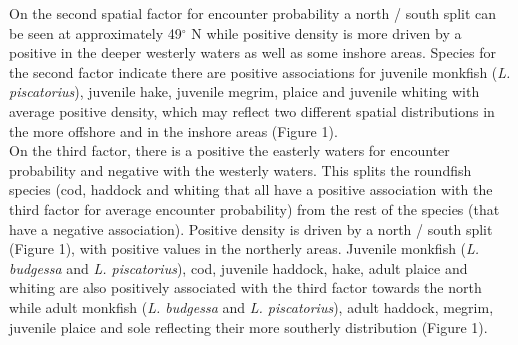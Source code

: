 \documentclass[fleqn,10pt]{wlscirep}
\begin{document}
\begin{linenumbers}
On the second spatial factor for  encounter probability a
north / south split can be seen at approximately 49$^{\circ}$ N while positive
density is more driven by a positive  in
the deeper westerly waters as well as some inshore areas. Species
 for the second factor indicate there are
positive associations for juvenile monkfish (\emph{L.  piscatorius}), juvenile
hake, juvenile megrim, plaice and juvenile whiting with average positive
density, which may reflect two different spatial distributions in the more
offshore and in the inshore areas (Figure 1).\\

On the third factor, there is a positive  the easterly waters for encounter probability
and negative  with the westerly waters. This splits
the roundfish species (cod, haddock and whiting that all have a positive
association with the third factor for average encounter probability) from the
rest of the species (that have a negative association). Positive density is
driven by a north / south split (Figure 1), with positive
 values in the northerly areas. Juvenile monkfish
(\emph{L.  budgessa} and \emph{L.  piscatorius}), cod, juvenile haddock, hake,
adult plaice and whiting are also positively associated with the third factor
towards the north while adult monkfish (\emph{L. budgessa} and \emph{L.
	piscatorius}), adult haddock, megrim, juvenile plaice and sole
 reflecting
their more southerly distribution (Figure 1).\\


\end{linenumbers}
\end{document}
